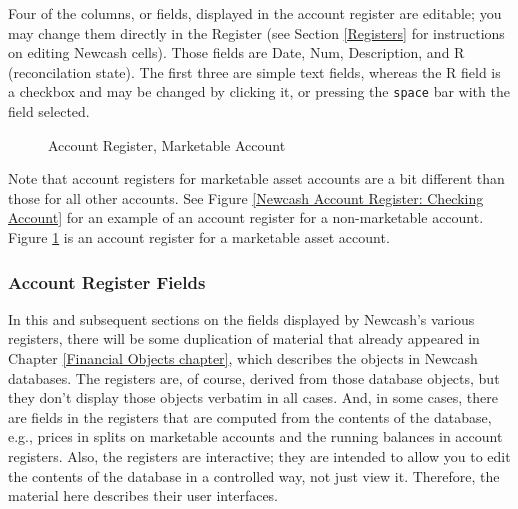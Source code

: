 \documentclass{report}
\newcommand{\graphicsfig}[5]{
\begin{figure}[#5]
\begin{center}
\resizebox{#1}{!}{\texttt{[image: \#2]}}
\end{center}
\caption{#3}
\label{#4}
\end{figure}
}
\begin{document}
Four of the columns, or fields, displayed in the account register are editable; you may change them directly in the Register (see Section \ref{Registers} for instructions on editing Newcash cells). Those fields are Date, Num, Description, and R (reconcilation state). The first three are simple text fields, whereas the R field is a checkbox and may be changed by clicking it, or pressing the \verb|space| bar with the field selected.

\graphicsfig{5in}{figures/marketable_account_register.png}{Account Register, Marketable Account}{Account Register, Marketable Account}{h!}
Note that account registers for marketable asset accounts are a bit different than those for all other accounts. See Figure \ref{Newcash Account Register: Checking Account} for an example of an account register for a non-marketable account. Figure \ref{Account Register, Marketable Account} is an account register for a marketable asset account.

\subsubsection{Account Register Fields}
In this and subsequent sections on the fields displayed by Newcash's various registers, there will be some duplication of material that already appeared in Chapter \ref{Financial Objects chapter}, which describes the objects in Newcash databases. The registers are, of course, derived from those database objects, but they don't display those objects verbatim in all cases. And, in some cases, there are fields in the registers that are computed from the contents of the database, e.g., prices in splits on marketable accounts and the running balances in account registers. Also, the registers are interactive; they are intended to allow you to edit the contents of the database in a controlled way, not just view it. Therefore, the material here describes their user interfaces.
\end{document}
